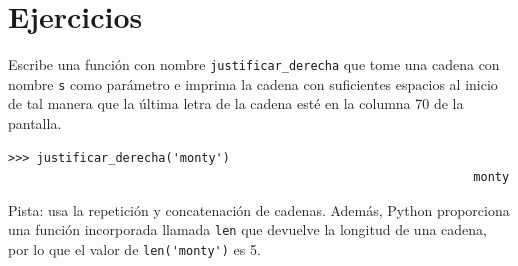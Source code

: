 \documentclass[10pt]{book}
\begin{document}
\section{Ejercicios}

\begin{exercise}

Escribe una función con nombre \verb"justificar_derecha" que tome una cadena
con nombre {\tt s} como parámetro e imprima la cadena con suficientes
espacios al inicio de tal manera que la última letra de la cadena esté en la columna 70
de la pantalla.

\begin{verbatim}
>>> justificar_derecha('monty')
                                                                 monty
\end{verbatim}

Pista: usa la repetición y concatenación de cadenas.  Además,
Python proporciona una función incorporada llamada {\tt len} que
devuelve la longitud de una cadena, por lo que el valor de \verb"len('monty')" es 5.

\end{exercise}
\end{document}
